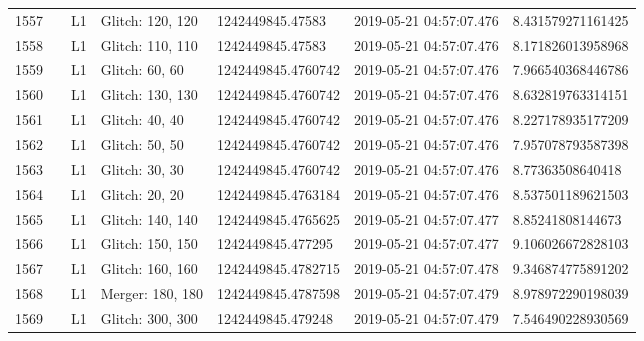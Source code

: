 \begin{longtable}{lllllll}
1557 &                                                    &       L1 &  Glitch: 120, 120 &    1242449845.47583 &  2019-05-21 04:57:07.476 &   8.431579271161425 \\
1558 &                                                    &       L1 &  Glitch: 110, 110 &    1242449845.47583 &  2019-05-21 04:57:07.476 &   8.171826013958968 \\
1559 &                                                    &       L1 &    Glitch: 60, 60 &  1242449845.4760742 &  2019-05-21 04:57:07.476 &   7.966540368446786 \\
1560 &                                                    &       L1 &  Glitch: 130, 130 &  1242449845.4760742 &  2019-05-21 04:57:07.476 &   8.632819763314151 \\
1561 &                                                    &       L1 &    Glitch: 40, 40 &  1242449845.4760742 &  2019-05-21 04:57:07.476 &   8.227178935177209 \\
1562 &                                                    &       L1 &    Glitch: 50, 50 &  1242449845.4760742 &  2019-05-21 04:57:07.476 &   7.957078793587398 \\
1563 &                                                    &       L1 &    Glitch: 30, 30 &  1242449845.4760742 &  2019-05-21 04:57:07.476 &    8.77363508640418 \\
1564 &                                                    &       L1 &    Glitch: 20, 20 &  1242449845.4763184 &  2019-05-21 04:57:07.476 &   8.537501189621503 \\
1565 &                                                    &       L1 &  Glitch: 140, 140 &  1242449845.4765625 &  2019-05-21 04:57:07.477 &    8.85241808144673 \\
1566 &                                                    &       L1 &  Glitch: 150, 150 &   1242449845.477295 &  2019-05-21 04:57:07.477 &   9.106026672828103 \\
1567 &                                                    &       L1 &  Glitch: 160, 160 &  1242449845.4782715 &  2019-05-21 04:57:07.478 &   9.346874775891202 \\
1568 &                                                    &       L1 &  Merger: 180, 180 &  1242449845.4787598 &  2019-05-21 04:57:07.479 &   8.978972290198039 \\
1569 &                                                    &       L1 &  Glitch: 300, 300 &   1242449845.479248 &  2019-05-21 04:57:07.479 &   7.546490228930569 \\

\end{longtable}
